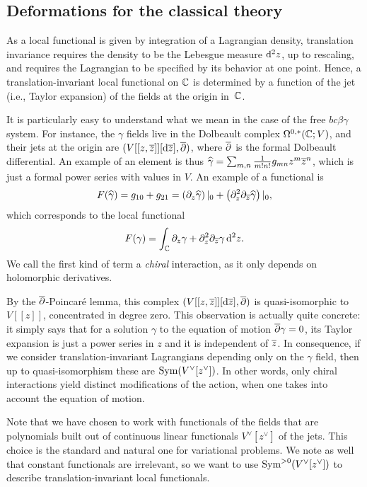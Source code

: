 \subsection{Deformations for the classical theory}

As a local functional is given by integration of a Lagrangian density,
translation invariance requires the density to be the Lebesgue measure ${\rm d}^2 z$, up to rescaling,  
and requires the Lagrangian to be specified by its behavior at one point.
Hence, a translation-invariant local functional on $\mathbb C$ is determined by a function of the jet (i.e., Taylor expansion) of the fields at the origin in~$\mathbb C$. 

It is particularly easy to understand what we mean in the case of the free $bc\beta\gamma$ system.
For instance, the $\gamma$ fields live in the Dolbeault complex $\Omega^{0,*}(\mathbb C ; V)$,
and their jets at the origin are $(V [[z,\overline{z}]] [{\rm d} \overline{z}] , \overline{\partial})$,
where $\overline{\partial}$ is the formal Dolbeault differential. 
An example of an element is thus $\widehat{\gamma} = \sum_{m,n} \frac{1}{m!n!}g_{mn} z^m \overline{z}^n$,
which is just a formal power series with values in $V$.
An example of a functional is
\[
F(\widehat{\gamma}) = g_{10} + g_{21} = \left( \partial_z \widehat{\gamma}\right)|_0 + \left( \partial_z^2 \partial_{\overline{z}} \widehat{\gamma}\right)|_0,
\]
which corresponds to the local functional
\[
F(\gamma) = \int_\mathbb C \partial_z \gamma + \partial_z^2 \partial_{\overline{z}} {\gamma}\,{\rm d}^2 z.
\]
We call the first kind of term a {\em chiral} interaction, as it only depends on holomorphic derivatives.

By the $\overline{\partial}$-Poincar\'{e} lemma, 
this complex $(V [[z,\overline{z}]] [{\rm d} \overline{z}] , \overline{\partial})$ is quasi-isomorphic to $V[[z]]$, concentrated in degree zero. 
This observation is actually quite concrete:
it simply says that for a solution $\gamma$ to the equation of motion $\overline{\partial} \gamma = 0$, 
its Taylor expansion is just a power series in $z$ and it is independent of $\overline{z}$.
In consequence, if we consider translation-invariant Lagrangians depending only on the $\gamma$ field, then up to quasi-isomorphism these are ${\rm Sym}(V^\vee[z^\vee])$.
In other words, only chiral interactions yield distinct modifications of the action,
when one takes into account the equation of motion.

Note that we have chosen to work with functionals of the fields
that are polynomials built out of continuous linear functionals $V^\vee[z^\vee]$ of the jets.
This choice is the standard and natural one for variational problems.
We note as well that constant functionals are irrelevant,
so we want to use ${\rm Sym}^{>0}(V^\vee[z^\vee])$ to describe translation-invariant local functionals.

